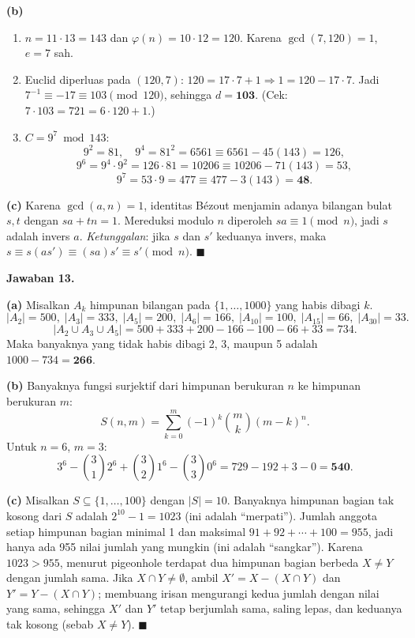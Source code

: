 \documentclass[11pt,a4paper]{article}
\newcommand{\jawab}[1]{\vspace{4pt}\noindent\textbf{Jawaban #1.}\par\nobreak\vspace{2pt}}
\begin{document}
\textbf{(b)}
\begin{enumerate}[label=(\roman*),leftmargin=*,nosep]
  \item $n = 11 \cdot 13 = 143$ dan $\varphi(n) = 10 \cdot 12 = 120$.
        Karena $\gcd(7,120) = 1$, $e = 7$ sah.
  \item Euclid diperluas pada $(120, 7)$:
        $120 = 17\cdot7 + 1 \Rightarrow 1 = 120 - 17\cdot 7$.
        Jadi $7^{-1} \equiv -17 \equiv 103 \pmod{120}$, sehingga $d = \mathbf{103}$.
        (Cek: $7 \cdot 103 = 721 = 6 \cdot 120 + 1$.)
  \item $C = 9^{7} \bmod 143$:
        \[
        9^{2} = 81,\quad
        9^{4} = 81^{2} = 6561 \equiv 6561 - 45(143) = 126,
        \]
        \[
        9^{6} = 9^{4}\cdot 9^{2} = 126 \cdot 81 = 10206 \equiv 10206 - 71(143) = 53,
        \]
        \[
        9^{7} = 53 \cdot 9 = 477 \equiv 477 - 3(143) = \mathbf{48}.
        \]
\end{enumerate}

\textbf{(c)} Karena $\gcd(a,n) = 1$, identitas B\'ezout menjamin adanya bilangan
bulat $s,t$ dengan $sa + tn = 1$. Mereduksi modulo $n$ diperoleh
$sa \equiv 1 \pmod n$, jadi $s$ adalah invers $a$.
\emph{Ketunggalan}: jika $s$ dan $s'$ keduanya invers, maka
$s \equiv s(as') \equiv (sa)s' \equiv s' \pmod n$. $\blacksquare$

\jawab{13}
\textbf{(a)} Misalkan $A_k$ himpunan bilangan pada $\{1,\dots,1000\}$ yang habis
dibagi $k$.
\[
|A_2| = 500,\; |A_3| = 333,\; |A_5| = 200,\;
|A_6| = 166,\; |A_{10}| = 100,\; |A_{15}| = 66,\; |A_{30}| = 33.
\]
\[
|A_2 \cup A_3 \cup A_5| = 500+333+200-166-100-66+33 = 734 .
\]
Maka banyaknya yang tidak habis dibagi 2, 3, maupun 5 adalah
$1000 - 734 = \mathbf{266}$.

\textbf{(b)} Banyaknya fungsi surjektif dari himpunan berukuran $n$ ke himpunan
berukuran $m$:
\[
S(n,m) = \sum_{k=0}^{m} (-1)^{k} \binom{m}{k} (m-k)^{n}.
\]
Untuk $n = 6$, $m = 3$:
\[
3^{6} - \binom{3}{1}2^{6} + \binom{3}{2}1^{6} - \binom{3}{3}0^{6}
= 729 - 192 + 3 - 0 = \mathbf{540}.
\]

\textbf{(c)} Misalkan $S \subseteq \{1,\dots,100\}$ dengan $|S| = 10$.
Banyaknya himpunan bagian tak kosong dari $S$ adalah $2^{10} - 1 = 1023$
(ini adalah ``merpati''). Jumlah anggota setiap himpunan bagian minimal 1 dan
maksimal $91 + 92 + \cdots + 100 = 955$, jadi hanya ada 955 nilai jumlah yang
mungkin (ini adalah ``sangkar''). Karena $1023 > 955$, menurut pigeonhole
terdapat dua himpunan bagian berbeda $X \ne Y$ dengan jumlah sama.
Jika $X \cap Y \ne \emptyset$, ambil $X' = X - (X \cap Y)$ dan
$Y' = Y - (X \cap Y)$; membuang irisan mengurangi kedua jumlah dengan nilai
yang sama, sehingga $X'$ dan $Y'$ tetap berjumlah sama, saling lepas, dan
keduanya tak kosong (sebab $X \ne Y$). $\blacksquare$
\end{document}
